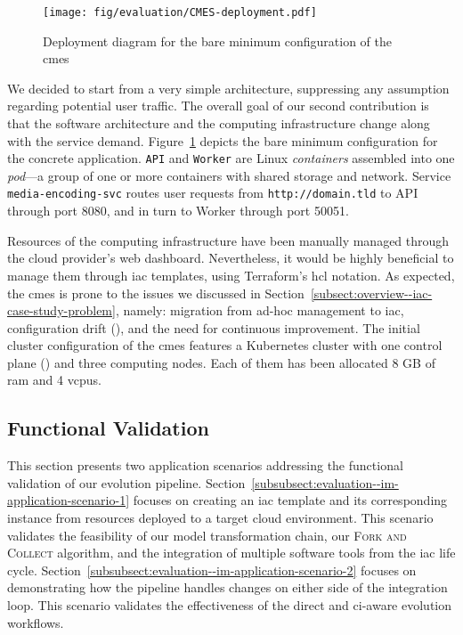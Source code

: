 \begin{figure}[h]
	\centering
	\texttt{[image: fig/evaluation/CMES-deployment.pdf]}
	\caption{Deployment diagram for the bare minimum configuration of the \gls{cmes}}
	\label{fig:evaluation--im-CMES-deployment}
\end{figure}

We decided to start from a very simple architecture, suppressing any assumption regarding potential user traffic. The overall goal of our second contribution is that the software architecture and the computing infrastructure change along with the service demand. Figure~\ref{fig:evaluation--im-CMES-deployment} depicts the bare minimum configuration for the concrete application. \texttt{API} and \texttt{Worker} are Linux \emph{containers} assembled into one \emph{pod}---a group of one or more containers with shared storage and network. Service \texttt{media-encoding-svc} routes user requests from \texttt{http://domain.tld} to API through port 8080, and in turn to Worker through port 50051.

Resources of the computing infrastructure have been manually managed through the cloud provider's web dashboard. Nevertheless, it would be highly beneficial to manage them through \gls{iac} templates, using Terraform's \gls{hcl} notation. As expected, the \gls{cmes} is prone to the issues we discussed in Section~\ref{subsect:overview--iac-case-study-problem}, namely: migration from ad-hoc management to \gls{iac}, configuration drift (), and the need for continuous improvement. The initial cluster configuration of the \gls{cmes} features a Kubernetes cluster with one control plane () and three computing nodes. Each of them has been allocated 8 GB of \gls{ram} and 4 \glspl{vcpu}.

\subsection{Functional Validation}
\label{subsect:evaluation--im-functional-validation}

This section presents two application scenarios addressing the functional validation of our evolution pipeline. Section~\ref{subsubsect:evaluation--im-application-scenario-1} focuses on creating an \gls{iac} template and its corresponding instance from resources deployed to a target cloud environment. This scenario validates the feasibility of our model transformation chain, our \textsc{Fork and Collect} algorithm, and the integration of multiple software tools from the \gls{iac} life cycle. Section~\ref{subsubsect:evaluation--im-application-scenario-2} focuses on demonstrating how the pipeline handles changes on either side of the integration loop. This scenario validates the effectiveness of the direct and \gls{ci}-aware evolution workflows.

